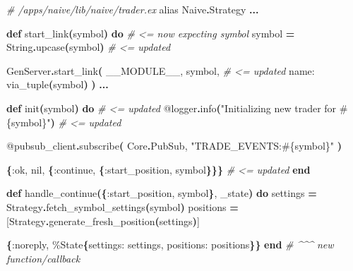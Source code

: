\documentclass[
  oneside]{book}
\newenvironment{Shaded}{\begin{snugshade}}{\end{snugshade}}
\newcommand{\CommentTok}[1]{\textcolor[rgb]{0.56,0.35,0.01}{\textit{#1}}}
\newcommand{\ConstantTok}[1]{\textcolor[rgb]{0.56,0.35,0.01}{#1}}
\newcommand{\FunctionTok}[1]{\textcolor[rgb]{0.13,0.29,0.53}{\textbf{#1}}}
\newcommand{\ImportTok}[1]{#1}
\newcommand{\KeywordTok}[1]{\textcolor[rgb]{0.13,0.29,0.53}{\textbf{#1}}}
\newcommand{\NormalTok}[1]{#1}
\newcommand{\OperatorTok}[1]{\textcolor[rgb]{0.81,0.36,0.00}{\textbf{#1}}}
\newcommand{\OtherTok}[1]{\textcolor[rgb]{0.56,0.35,0.01}{#1}}
\newcommand{\StringTok}[1]{\textcolor[rgb]{0.31,0.60,0.02}{#1}}
\newcommand{\VariableTok}[1]{\textcolor[rgb]{0.00,0.00,0.00}{#1}}
\begin{document}
\begin{Shaded}
\begin{Highlighting}[]
  \CommentTok{\# /apps/naive/lib/naive/trader.ex}
   \ImportTok{alias} \ConstantTok{Naive}\OperatorTok{.}\ConstantTok{Strategy}
   \OperatorTok{...}

  \KeywordTok{def}\NormalTok{ start\_link}\FunctionTok{(}\NormalTok{symbol}\FunctionTok{)} \KeywordTok{do} \CommentTok{\# \textless{}= now expecting symbol}
\NormalTok{    symbol }\OperatorTok{=} \ConstantTok{String}\OperatorTok{.}\NormalTok{upcase}\FunctionTok{(}\NormalTok{symbol}\FunctionTok{)} \CommentTok{\# \textless{}= updated}

    \ConstantTok{GenServer}\OperatorTok{.}\NormalTok{start\_link}\FunctionTok{(}
      \ConstantTok{\_\_MODULE\_\_}\NormalTok{,}
\NormalTok{      symbol,   }\CommentTok{\# \textless{}= updated}
      \VariableTok{name:}\NormalTok{ via\_tuple}\FunctionTok{(}\NormalTok{symbol}\FunctionTok{)}
    \FunctionTok{)}
    \OperatorTok{...}

  \KeywordTok{def}\NormalTok{ init}\FunctionTok{(}\NormalTok{symbol}\FunctionTok{)} \KeywordTok{do} \CommentTok{\# \textless{}= updated}
    \OtherTok{@logger}\OperatorTok{.}\NormalTok{info}\FunctionTok{(}\StringTok{"Initializing new trader for }\OtherTok{\#\{}\NormalTok{symbol}\OtherTok{\}}\StringTok{"}\FunctionTok{)} \CommentTok{\# \textless{}= updated}

    \OtherTok{@pubsub\_client}\OperatorTok{.}\NormalTok{subscribe}\FunctionTok{(}
      \ConstantTok{Core}\OperatorTok{.}\ConstantTok{PubSub}\NormalTok{,}
      \StringTok{"TRADE\_EVENTS:}\OtherTok{\#\{}\NormalTok{symbol}\OtherTok{\}}\StringTok{"}
    \FunctionTok{)}

    \FunctionTok{\{}\VariableTok{:ok}\NormalTok{, }\ConstantTok{nil}\NormalTok{, }\FunctionTok{\{}\VariableTok{:continue}\NormalTok{, }\FunctionTok{\{}\VariableTok{:start\_position}\NormalTok{, symbol}\FunctionTok{\}\}\}} \CommentTok{\# \textless{}= updated}
  \KeywordTok{end}

  \KeywordTok{def}\NormalTok{ handle\_continue}\FunctionTok{(\{}\VariableTok{:start\_position}\NormalTok{, symbol}\FunctionTok{\}}\NormalTok{, \_state}\FunctionTok{)} \KeywordTok{do}
\NormalTok{    settings }\OperatorTok{=} \ConstantTok{Strategy}\OperatorTok{.}\NormalTok{fetch\_symbol\_settings}\FunctionTok{(}\NormalTok{symbol}\FunctionTok{)}
\NormalTok{    positions }\OperatorTok{=} \OtherTok{[}\ConstantTok{Strategy}\OperatorTok{.}\NormalTok{generate\_fresh\_position}\FunctionTok{(}\NormalTok{settings}\FunctionTok{)}\OtherTok{]}

    \FunctionTok{\{}\VariableTok{:noreply}\NormalTok{, \%}\ConstantTok{State}\FunctionTok{\{}\VariableTok{settings:}\NormalTok{ settings, }\VariableTok{positions:}\NormalTok{ positions}\FunctionTok{\}\}}
  \KeywordTok{end} \CommentTok{\# \^{}\^{}\^{} new function/callback}
\end{Highlighting}
\end{Shaded}
\end{document}
